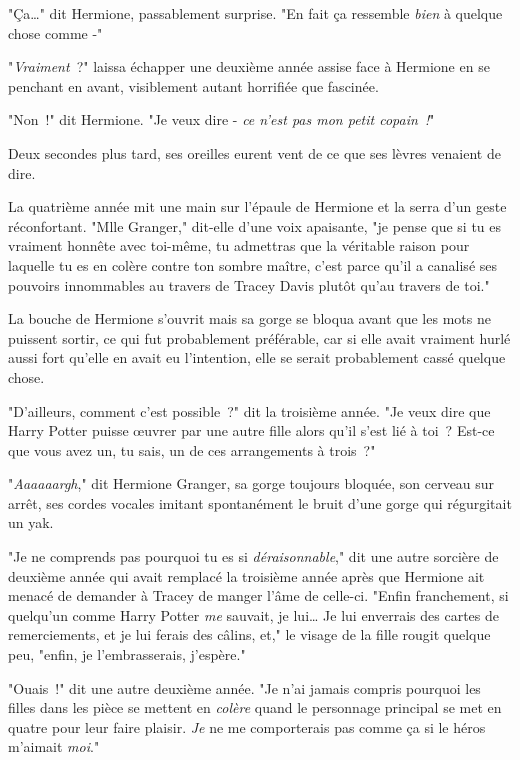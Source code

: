 "Ça…" dit Hermione, passablement surprise. "En fait ça ressemble \emph{bien} à quelque chose comme -"

"\emph{Vraiment}~?" laissa échapper une deuxième année assise face à Hermione en se penchant en avant, visiblement autant horrifiée que fascinée.

"Non~!" dit Hermione. "Je veux dire - \emph{ce n'est pas mon petit copain~!}"

Deux secondes plus tard, ses oreilles eurent vent de ce que ses lèvres venaient de dire.

La quatrième année mit une main sur l'épaule de Hermione et la serra d'un geste réconfortant. "Mlle Granger," dit-elle d'une voix apaisante, "je pense que si tu es vraiment honnête avec toi-même, tu admettras que la véritable raison pour laquelle tu es en colère contre ton sombre maître, c'est parce qu'il a canalisé ses pouvoirs innommables au travers de Tracey Davis plutôt qu'au travers de toi."

La bouche de Hermione s'ouvrit mais sa gorge se bloqua avant que les mots ne puissent sortir, ce qui fut probablement préférable, car si elle avait vraiment hurlé aussi fort qu'elle en avait eu l'intention, elle se serait probablement cassé quelque chose.

"D'ailleurs, comment c'est possible~?" dit la troisième année. "Je veux dire que Harry Potter puisse œuvrer par une autre fille alors qu'il s'est lié à toi~? Est-ce que vous avez un, tu sais, un de ces arrangements à trois~?"

"\emph{Aaaaaargh}," dit Hermione Granger, sa gorge toujours bloquée, son cerveau sur arrêt, ses cordes vocales imitant spontanément le bruit d'une gorge qui régurgitait un yak.


"Je ne comprends pas pourquoi tu es si \emph{déraisonnable}," dit une autre sorcière de deuxième année qui avait remplacé la troisième année après que Hermione ait menacé de demander à Tracey de manger l'âme de celle-ci. "Enfin franchement, si quelqu'un comme Harry Potter \emph{me} sauvait, je lui… Je lui enverrais des cartes de remerciements, et je lui ferais des câlins, et," le visage de la fille rougit quelque peu, "enfin, je l'embrasserais, j'espère."

"Ouais~!" dit une autre deuxième année. "Je n'ai jamais compris pourquoi les filles dans les pièce se mettent en \emph{colère} quand le personnage principal se met en quatre pour leur faire plaisir. \emph{Je} ne me comporterais pas comme ça si le héros m'aimait \emph{moi}."

